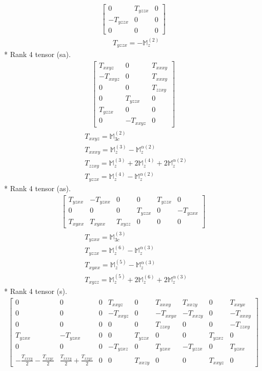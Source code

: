 \documentclass[fleqn,8pt,landscape]{jsarticle}
\begin{document}
\begin{align*}
\begin{bmatrix} 0 & T_{yzzx} & 0 \\ - T_{yzzx} & 0 & 0 \\ 0 & 0 & 0 \end{bmatrix}
\end{align*}
\begin{align*}
& T_{yzzx} = - \mathbb{M}_{z}^{(2)}
\end{align*}
* Rank 4 tensor (sa).
\begin{align*}
\begin{bmatrix} T_{xxyz} & 0 & T_{xxxy} \\ - T_{xxyz} & 0 & T_{xxxy} \\ 0 & 0 & T_{zzxy} \\ 0 & T_{yzzx} & 0 \\ T_{yzzx} & 0 & 0 \\ 0 & - T_{xxyz} & 0 \end{bmatrix}
\end{align*}
\begin{align*}
& T_{xxyz} = \mathbb{M}_{3c}^{(2)} \\
& T_{xxxy} = \mathbb{M}_{z}^{(3)} - \mathbb{M}_{z}^{\alpha(2)} \\
& T_{zzxy} = \mathbb{M}_{z}^{(3)} + 2 \mathbb{M}_{z}^{(4)} + 2 \mathbb{M}_{z}^{\alpha(2)} \\
& T_{yzzx} = \mathbb{M}_{z}^{(4)} - \mathbb{M}_{z}^{\alpha(2)}
\end{align*}
* Rank 4 tensor (as).
\begin{align*}
\begin{bmatrix} T_{yzxx} & - T_{yzxx} & 0 & 0 & T_{yzzx} & 0 \\ 0 & 0 & 0 & T_{yzzx} & 0 & - T_{yzxx} \\ T_{xyxx} & T_{xyxx} & T_{xyzz} & 0 & 0 & 0 \end{bmatrix}
\end{align*}
\begin{align*}
& T_{yzxx} = \mathbb{M}_{3c}^{(3)} \\
& T_{yzzx} = \mathbb{M}_{z}^{(6)} - \mathbb{M}_{z}^{\alpha(3)} \\
& T_{xyxx} = \mathbb{M}_{z}^{(5)} - \mathbb{M}_{z}^{\alpha(3)} \\
& T_{xyzz} = \mathbb{M}_{z}^{(5)} + 2 \mathbb{M}_{z}^{(6)} + 2 \mathbb{M}_{z}^{\alpha(3)}
\end{align*}
* Rank 4 tensor (s).
\begin{align*}
\begin{bmatrix} 0 & 0 & 0 & T_{xxyz} & 0 & T_{xxxy} & T_{xxzy} & 0 & T_{xxyx} \\ 0 & 0 & 0 & - T_{xxyz} & 0 & - T_{xxyx} & - T_{xxzy} & 0 & - T_{xxxy} \\ 0 & 0 & 0 & 0 & 0 & T_{zzxy} & 0 & 0 & - T_{zzxy} \\ T_{yzxx} & - T_{yzxx} & 0 & 0 & T_{yzzx} & 0 & 0 & T_{yzxz} & 0 \\ 0 & 0 & 0 & - T_{yzxz} & 0 & T_{yzxx} & - T_{yzzx} & 0 & T_{yzxx} \\ - \frac{T_{xxxy}}{2} - \frac{T_{xxyx}}{2} & \frac{T_{xxxy}}{2} + \frac{T_{xxyx}}{2} & 0 & 0 & T_{xxzy} & 0 & 0 & T_{xxyz} & 0 \end{bmatrix}
\end{align*}
\end{document}

